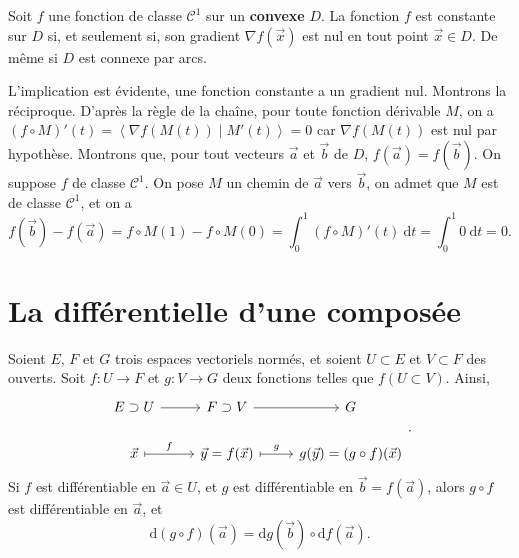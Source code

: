 \begin{prop}
	Soit $f$ une fonction de classe $\mathcal{C}^1$ sur un \textbf{convexe} $D$. La fonction $f$ est constante sur $D$ si, et seulement si, son gradient $\nabla f(\vec{x})$ est nul en tout point $\vec{x} \in D$. De même si $D$ est connexe par arcs.
\end{prop}

\begin{prv}
	L'implication est évidente, une fonction constante a un gradient nul.
	Montrons la réciproque. D'après la règle de la chaîne, pour toute fonction dérivable $M$, on a $(f \circ M)'(t) = \left<\nabla f(M(t))  \mid M'(t) \right> = 0$ car $\nabla f(M(t))$ est nul par hypothèse.
	Montrons que, pour tout vecteurs $\vec{a}$ et $\vec{b}$ de $D$, $f(\vec{a}) = f(\vec{b})$.
	On suppose $f$ de classe $\mathcal{C}^1$.
	On pose $M$ un chemin de $\vec{a}$ vers $\vec{b}$, on admet que $M$ est de classe $\mathcal{C}^1$, et on a \[
		f(\vec{b}) - f(\vec{a}) = f\circ M(1) - f\circ M(0) = \int_{0}^{1} (f\circ M)'(t)~\mathrm{d}t = \int_{0}^{1} 0~\mathrm{d}t = 0
	.\] 
\end{prv}

\section{La différentielle d'une composée}

\begin{prop}
	Soient $E$, $F$ et $G$ trois espaces vectoriels normés, et soient $U \subset E$ et $V \subset F$ des ouverts.
	Soit $f : U \to F$ et $g : V \to G$ deux fonctions telles que $f(U \subset V)$.
	Ainsi,
	\[
		\begin{tikzcd}
			E \supset U \ar[r]  & F \supset V \ar[r] & G\\
			\vec{x} \ar[r, mapsto, "f"] & \vec{y} = f(\vec{x}) \ar[r, mapsto, "g"] & g(\vec{y}) = (g  \circ f)(\vec{x})
		\end{tikzcd}
	.\]
	Si $f$ est différentiable en $\vec{a} \in U$, et $g$ est différentiable en $\vec{b} = f(\vec{a})$, alors $g \circ f$ est différentiable en $\vec{a}$, et \[
		\boxed{\mathrm{d}(g  \circ f)(\vec{a}) = \mathrm{d}g(\vec{b})  \circ \mathrm{d}f(\vec{a}).}
	\]
\end{prop}

